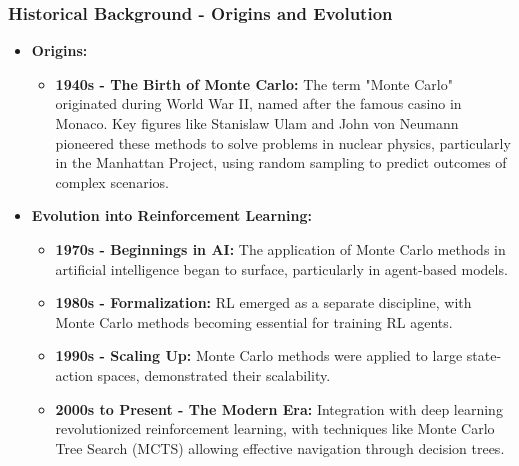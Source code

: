 \documentclass[aspectratio=169]{beamer}
\begin{document}
\begin{frame}[fragile]
    \frametitle{Historical Background - Origins and Evolution}
    \begin{itemize}
        \item \textbf{Origins:}
        \begin{itemize}
            \item \textbf{1940s - The Birth of Monte Carlo:} 
            The term "Monte Carlo" originated during World War II, named after the famous casino in Monaco. Key figures like Stanislaw Ulam and John von Neumann pioneered these methods to solve problems in nuclear physics, particularly in the Manhattan Project, using random sampling to predict outcomes of complex scenarios.
        \end{itemize}

        \item \textbf{Evolution into Reinforcement Learning:}
        \begin{itemize}
            \item \textbf{1970s - Beginnings in AI:} The application of Monte Carlo methods in artificial intelligence began to surface, particularly in agent-based models.
            \item \textbf{1980s - Formalization:} RL emerged as a separate discipline, with Monte Carlo methods becoming essential for training RL agents.
            \item \textbf{1990s - Scaling Up:} Monte Carlo methods were applied to large state-action spaces, demonstrated their scalability.
            \item \textbf{2000s to Present - The Modern Era:} Integration with deep learning revolutionized reinforcement learning, with techniques like Monte Carlo Tree Search (MCTS) allowing effective navigation through decision trees.
        \end{itemize}
    \end{itemize}
\end{frame}
\end{document}
